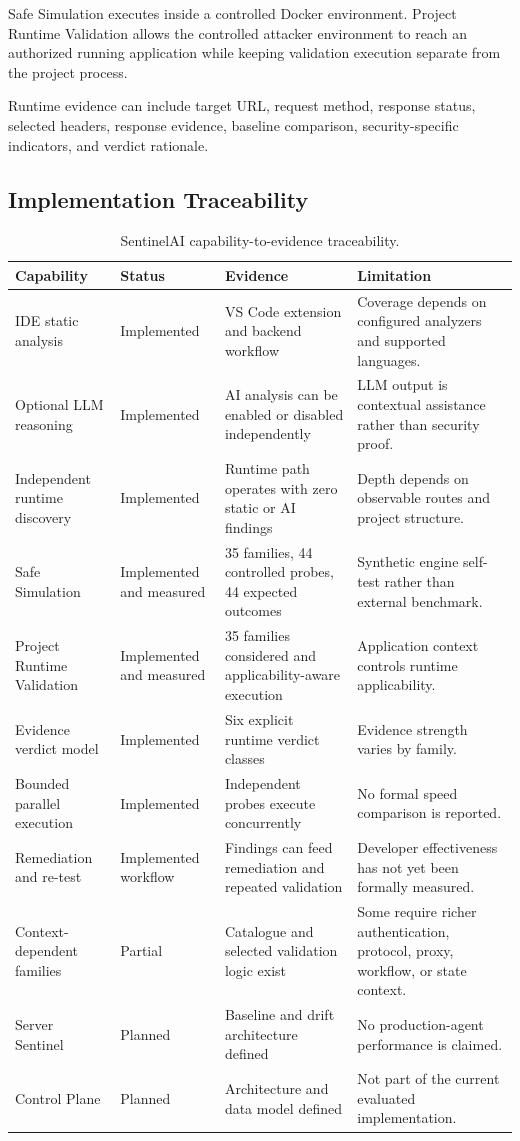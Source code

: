 \documentclass[journal]{IEEEtran}
\begin{document}
Safe Simulation executes inside a controlled Docker environment. Project
Runtime Validation allows the controlled attacker environment to reach an
authorized running application while keeping validation execution separate
from the project process.

Runtime evidence can include target URL, request method, response status,
selected headers, response evidence, baseline comparison, security-specific
indicators, and verdict rationale.

\subsection{Implementation Traceability}

\begin{table}[!t]
\centering
\caption{SentinelAI capability-to-evidence traceability.}
\label{tab:traceability}
\scriptsize
\begin{tabularx}{\textwidth}{p{3.0cm}p{2.2cm}p{4.0cm}X}
\toprule
\textbf{Capability} &
\textbf{Status} &
\textbf{Evidence} &
\textbf{Limitation} \\
\midrule
IDE static analysis &
Implemented &
VS Code extension and backend workflow &
Coverage depends on configured analyzers and supported languages. \\
Optional LLM reasoning &
Implemented &
AI analysis can be enabled or disabled independently &
LLM output is contextual assistance rather than security proof. \\
Independent runtime discovery &
Implemented &
Runtime path operates with zero static or AI findings &
Depth depends on observable routes and project structure. \\
Safe Simulation &
Implemented and measured &
35 families, 44 controlled probes, 44 expected outcomes &
Synthetic engine self-test rather than external benchmark. \\
Project Runtime Validation &
Implemented and measured &
35 families considered and applicability-aware execution &
Application context controls runtime applicability. \\
Evidence verdict model &
Implemented &
Six explicit runtime verdict classes &
Evidence strength varies by family. \\
Bounded parallel execution &
Implemented &
Independent probes execute concurrently &
No formal speed comparison is reported. \\
Remediation and re-test &
Implemented workflow &
Findings can feed remediation and repeated validation &
Developer effectiveness has not yet been formally measured. \\
Context-dependent families &
Partial &
Catalogue and selected validation logic exist &
Some require richer authentication, protocol, proxy, workflow, or state context. \\
Server Sentinel &
Planned &
Baseline and drift architecture defined &
No production-agent performance is claimed. \\
Control Plane &
Planned &
Architecture and data model defined &
Not part of the current evaluated implementation. \\
\bottomrule
\end{tabularx}
\end{table}
\end{document}
